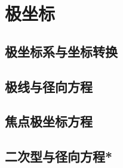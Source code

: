 \section{极坐标}
\label{sec:quadratic-polar-coordinates}


\subsection{极坐标系与坐标转换}
\label{subsec:quadratic-coordinates}

\subsection{极线与径向方程}
\label{subsec:quadratic-polar-line-and-radial-equation}

\subsection{焦点极坐标方程}
\label{subsec:quadratic-focal-polar-equation}

\subsection{二次型与径向方程*}
\label{subsec:quadratic-quadratic-forms-and-radial-equation}

